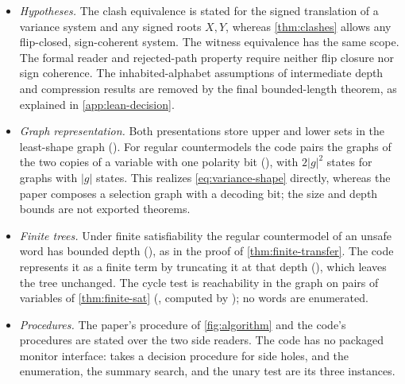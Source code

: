 \begin{itemize}[leftmargin=*]
extension restricts to a solution of the original system that satisfies
\eqref{eq:fixed-witness} (), and every
such solution extends (). Through the signed
translation these are the two directions of \cref{lem:spine} for fixed
assignments, which suffices for every witness transfer.
The paper assigns suffix embeddings to fresh spine variables;
 instead uses traces of the normalized root
trees.
\item \emph{Hypotheses.} The clash equivalence
 is stated for the signed
translation of a variance system and any signed roots $X,Y$, whereas
\cref{thm:clashes} allows any flip-closed, sign-coherent system. The
witness equivalence  has the
same scope.
The formal reader and rejected-path property require neither flip closure
nor sign coherence.
The inhabited-alphabet assumptions of intermediate depth and compression
results are removed by the final bounded-length theorem, as explained
in \cref{app:lean-decision}.
\item \emph{Graph representation.} Both presentations store upper and lower
sets in the least-shape graph (). For
regular countermodels the code pairs the graphs of the two copies of a
variable with one polarity bit (), with $2|g|^2$ states
for graphs with $|g|$ states. This realizes \eqref{eq:variance-shape}
directly, whereas the paper composes a selection graph with a decoding bit;
the size and depth bounds are not exported theorems.
\item \emph{Finite trees.} Under finite satisfiability the regular
countermodel of an unsafe word has bounded depth
(), as in the proof of
\cref{thm:finite-transfer}. The code represents it as a finite term by
truncating it at that depth (), which
leaves the tree unchanged. The cycle test is reachability in the graph on
pairs of variables of \cref{thm:finite-sat}
(, computed by );
no words are enumerated.
\item \emph{Procedures.} The paper's procedure of \cref{fig:algorithm} and
the code's procedures are stated over the two side readers. The code has no
packaged monitor interface:  takes a
decision procedure for side holes, and the enumeration, the summary search,
and the unary test are its three instances.

\end{itemize}
